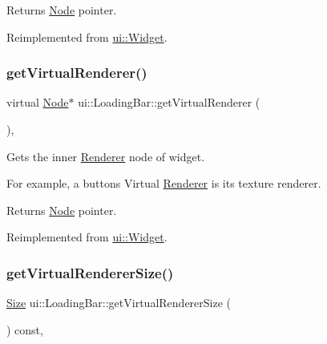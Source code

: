 \begin{DoxyReturn}{Returns}
\hyperlink{classNode}{Node} pointer. 
\end{DoxyReturn}


Reimplemented from \hyperlink{classui_1_1Widget_acf862bf9235fbb3823819eeb65d46f25}{ui\+::\+Widget}.

\mbox{\label{classui_1_1LoadingBar_a7c47d606b1f71e090a3d9d2a904dbd92}} 
\subsubsection{\texorpdfstring{get\+Virtual\+Renderer()}{getVirtualRenderer()}\hspace{0.1cm}{\footnotesize\ttfamily [2/2]}}
{\footnotesize\ttfamily virtual \hyperlink{classNode}{Node}$\ast$ ui\+::\+Loading\+Bar\+::get\+Virtual\+Renderer (\begin{DoxyParamCaption}{ }\end{DoxyParamCaption})\hspace{0.3cm}{\ttfamily [override]}, {\ttfamily [virtual]}}

Gets the inner \hyperlink{classRenderer}{Renderer} node of widget.

For example, a button\textquotesingle{}s Virtual \hyperlink{classRenderer}{Renderer} is it\textquotesingle{}s texture renderer.

\begin{DoxyReturn}{Returns}
\hyperlink{classNode}{Node} pointer. 
\end{DoxyReturn}


Reimplemented from \hyperlink{classui_1_1Widget_acf862bf9235fbb3823819eeb65d46f25}{ui\+::\+Widget}.

\mbox{\label{classui_1_1LoadingBar_a10855c54a44cd470286e3243c1cb58a0}} 
\subsubsection{\texorpdfstring{get\+Virtual\+Renderer\+Size()}{getVirtualRendererSize()}\hspace{0.1cm}{\footnotesize\ttfamily [1/2]}}
{\footnotesize\ttfamily \hyperlink{classSize}{Size} ui\+::\+Loading\+Bar\+::get\+Virtual\+Renderer\+Size (\begin{DoxyParamCaption}{ }\end{DoxyParamCaption}) const\hspace{0.3cm}{\ttfamily [override]}, {\ttfamily [virtual]}}

